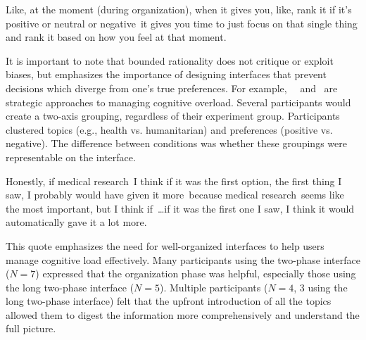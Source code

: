 \begin{displayquote}
Like, at the moment (during organization), when it gives you, like, rank it if it's positive or neutral or negative~\bracketellipsis it gives you time to just focus on that single thing and rank it based on how you feel at that moment. \hfill{}
\end{displayquote}

It is important to note that bounded rationality does not critique or exploit biases, but emphasizes the importance of designing interfaces that prevent decisions which diverge from one's true preferences. For example,~\underline{}~\cite{simonSciencesArtificial1996} and~\underline{} are strategic approaches to managing cognitive overload. Several participants would create a two-axis grouping, regardless of their experiment group. Participants clustered topics (e.g., health vs. humanitarian) and preferences (positive vs. negative). The difference between conditions was whether these groupings were representable on the interface.

\begin{displayquote}
    Honestly, if medical research~\bracketellipsis I think if it was the first option, the first thing I saw, I probably would have given it more~\bracketellipsis because medical research~\bracketellipsis seems like the most important, but I think if~\ldots if it was the first one I saw, I think it would automatically gave it a lot more. \hfill{}
\end{displayquote}

    

This quote emphasizes the need for well-organized interfaces to help users manage cognitive load effectively. Many participants using the two-phase interface ($N=7$) expressed that the organization phase was helpful, especially those using the long two-phase interface ($N=5$). Multiple participants ($N=4$, 3 using the long two-phase interface) felt that the upfront introduction of all the topics allowed them to digest the information more comprehensively and understand the full picture.

